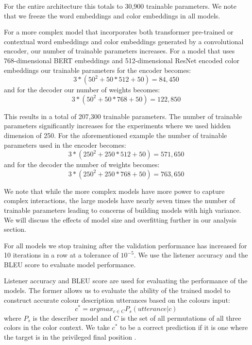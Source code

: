 For the entire architecture this totals to 30,900 trainable parameters. We note that we freeze the word embeddings and color embeddings in all models.

\par
For a more complex model that incorporates both transformer pre-trained or contextual word embeddings and color embeddings generated by a convolutional encoder, our number of trainable parameters increases. For a model that uses 768-dimensional BERT embeddings and 512-dimensional ResNet encoded color embeddings our trainable parameters for the encoder becomes:
\begin{equation}
  3*(50^2 + 50*512 +50) = 84,450
\end{equation}
and for the decoder our number of weights becomes:
\begin{equation}
  3*(50^2 + 50*768 +50) = 122,850
\end{equation}

\par
This results in a total of 207,300 trainable parameters. The number of trainable parameters significantly increases for the experiments where we used hidden dimension of 250. For the aforementioned example the number of trainable parameters used in the encoder becomes:
\begin{equation}
  3*(250^2 + 250*512 +50) = 571,650
\end{equation}
and for the decoder the number of weights becomes:
\begin{equation}
  3*(250^2 + 250*768 +50) = 763,650
\end{equation}

\par
We note that while the more complex models have more power to capture complex interactions, the large models have nearly seven times the number of trainable parameters leading to concerns of building models with high variance. We will discuss the effects of model size and overfitting further in our analysis section.

\par
For all models we stop training after the validation performance has increased for 10 iterations in a row at a tolerance of \(10^{-5}\). We use the listener accuracy and the BLEU score to evaluate model performance.

\par
Listener accuracy and BLEU score are used for evaluating the performance of the models. The former allows us to evaluate the ability of the trained model to construct accurate colour description utterances based on the colours input:
\begin{equation}
  c^{*} = argmax_{c \in C} P_{s} (utterance | c)
\end{equation}
where \(P_{s}\) is the describer model and \(C\) is the set of all permutations of all three colors in the color context. We take \(c^{*}\) to be a correct prediction if it is one where the target is in the privileged final position \citep{potts-2020-colors}.

